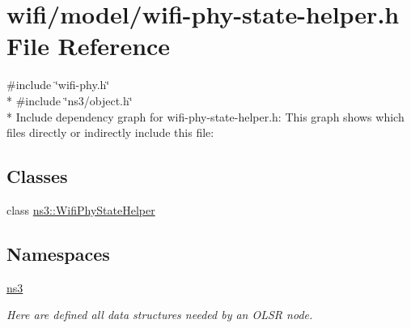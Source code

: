\hypertarget{wifi-phy-state-helper_8h}{}\section{wifi/model/wifi-\/phy-\/state-\/helper.h File Reference}
\label{wifi-phy-state-helper_8h}
{\ttfamily \#include \char`\"{}wifi-\/phy.\+h\char`\"{}}\\*
{\ttfamily \#include \char`\"{}ns3/object.\+h\char`\"{}}\\*
Include dependency graph for wifi-\/phy-\/state-\/helper.h\+:
This graph shows which files directly or indirectly include this file\+:
\subsection*{Classes}
\begin{DoxyCompactItemize}
\item 
class \hyperlink{classns3_1_1WifiPhyStateHelper}{ns3\+::\+Wifi\+Phy\+State\+Helper}
\end{DoxyCompactItemize}
\subsection*{Namespaces}
\begin{DoxyCompactItemize}
\item 
 \hyperlink{namespacens3}{ns3}
\begin{DoxyCompactList}\small\item\em Here are defined all data structures needed by an O\+L\+SR node. \end{DoxyCompactList}\end{DoxyCompactItemize}
